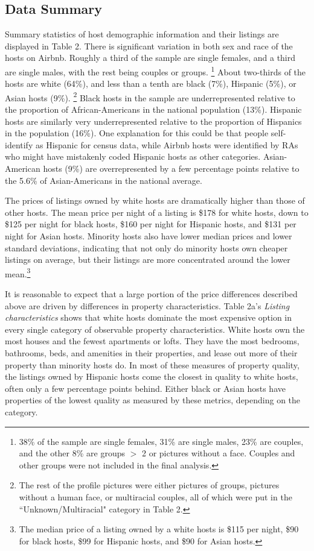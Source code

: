 \subsection{Data Summary}

Summary statistics of host demographic information and their listings are displayed in Table 2. There is significant variation in both sex and race of the hosts on Airbnb. Roughly a third of the sample are single females, and a third are single males, with the rest being couples or groups.%
	\footnote{38\% of the sample are single females, 31\% are single males, 23\% are couples, and the other 8\% are groups $>$ 2 or pictures without a face. Couples and other groups were not included in the final analysis.} 
About two-thirds of the hosts are white (64\%), and less than a tenth are black (7\%), Hispanic (5\%), or Asian hosts (9\%).%
	\footnote{The rest of the profile pictures were either pictures of groups, pictures without a human face, or multiracial couples, all of which were put in the ``Unknown/Multiracial" category in Table 2.} 
Black hosts in the sample are underrepresented relative to the proportion of African-Americans in the national population (13\%). Hispanic hosts are similarly very underrepresented relative to the proportion of Hispanics in the population (16\%). One explanation for this could be that people self-identify as Hispanic for census data, while Airbnb hosts were identified by RAs who might have mistakenly coded Hispanic hosts as other categories. Asian-American hosts (9\%) are overrepresented by a few percentage points relative to the 5.6\% of Asian-Americans in the national average.\cite{census} 

The prices of listings owned by white hosts are dramatically higher than those of other hosts. The mean price per night of a listing is \$178 for white hosts, down to \$125 per night for black hosts, \$160 per night for Hispanic hosts, and \$131 per night for Asian hosts. Minority hosts also have lower median prices and lower standard deviations, indicating that not only do minority hosts own cheaper listings on average, but their listings are more concentrated around the lower mean.\footnote{The median price of a listing owned by a white hosts is \$115 per night, \$90 for black hosts, \$99 for Hispanic hosts, and \$90 for Asian hosts.} 

It is reasonable to expect that a large portion of the price differences described above are driven by differences in property characteristics. Table 2a's \textit{Listing characteristics} shows that white hosts dominate the most expensive option in every single category of observable property characteristics. White hosts own the most houses and the fewest apartments or lofts. They have the most bedrooms, bathrooms, beds, and amenities in their properties, and lease out more of their property than minority hosts do. In most of these measures of property quality, the listings owned by Hispanic hosts come the closest in quality to white hosts, often only a few percentage points behind. Either black or Asian hosts have properties of the lowest quality as measured by these metrics, depending on the category. 

